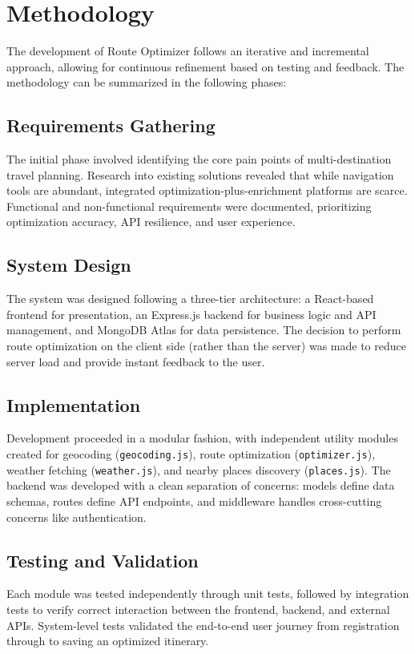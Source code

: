 \section{Methodology}
The development of Route Optimizer follows an iterative and incremental approach, allowing for continuous refinement based on testing and feedback. The methodology can be summarized in the following phases:

\subsection{Requirements Gathering}
The initial phase involved identifying the core pain points of multi-destination travel planning. Research into existing solutions revealed that while navigation tools are abundant, integrated optimization-plus-enrichment platforms are scarce. Functional and non-functional requirements were documented, prioritizing optimization accuracy, API resilience, and user experience.

\subsection{System Design}
The system was designed following a three-tier architecture: a React-based frontend for presentation, an Express.js backend for business logic and API management, and MongoDB Atlas for data persistence. The decision to perform route optimization on the client side (rather than the server) was made to reduce server load and provide instant feedback to the user.

\subsection{Implementation}
Development proceeded in a modular fashion, with independent utility modules created for geocoding (\texttt{geocoding.js}), route optimization (\texttt{optimizer.js}), weather fetching (\texttt{weather.js}), and nearby places discovery (\texttt{places.js}). The backend was developed with a clean separation of concerns: models define data schemas, routes define API endpoints, and middleware handles cross-cutting concerns like authentication.

\subsection{Testing and Validation}
Each module was tested independently through unit tests, followed by integration tests to verify correct interaction between the frontend, backend, and external APIs. System-level tests validated the end-to-end user journey from registration through to saving an optimized itinerary.

